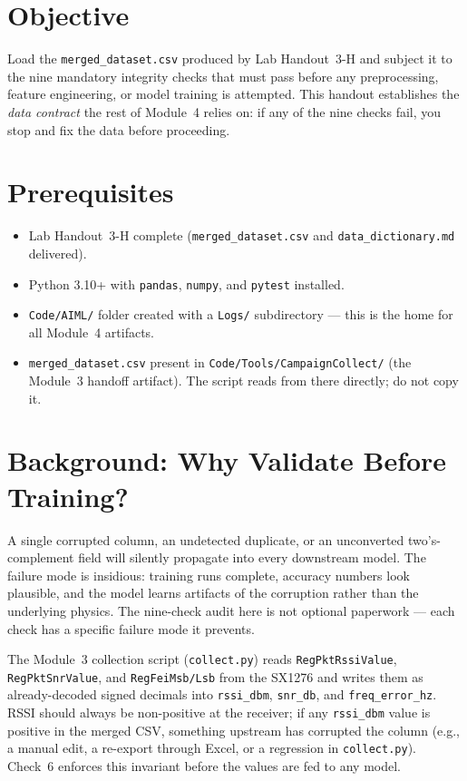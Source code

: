 \documentclass[11pt,letterpaper]{article}
\begin{document}

\section{Objective}
Load the \texttt{merged\_dataset.csv} produced by Lab Handout~3-H and subject it to the nine mandatory integrity checks that must pass before any preprocessing, feature engineering, or model training is attempted. This handout establishes the \emph{data contract} the rest of Module~4 relies on: if any of the nine checks fail, you stop and fix the data before proceeding.

\section{Prerequisites}
\begin{itemize}[leftmargin=2em]
	\item Lab Handout~3-H complete (\texttt{merged\_dataset.csv} and \texttt{data\_dictionary.md} delivered).
	\item Python 3.10+ with \texttt{pandas}, \texttt{numpy}, and \texttt{pytest} installed.
	\item \texttt{Code/AIML/} folder created with a \texttt{Logs/} subdirectory --- this is the home for all Module~4 artifacts.
	\item \texttt{merged\_dataset.csv} present in \texttt{Code/Tools/CampaignCollect/} (the Module~3 handoff artifact). The script reads from there directly; do not copy it.
\end{itemize}

\section{Background: Why Validate Before Training?}
A single corrupted column, an undetected duplicate, or an unconverted two's-complement field will silently propagate into every downstream model. The failure mode is insidious: training runs complete, accuracy numbers look plausible, and the model learns artifacts of the corruption rather than the underlying physics. The nine-check audit here is not optional paperwork --- each check has a specific failure mode it prevents.

\begin{tcolorbox}[infobox={Sign Sanity on RSSI}]
	The Module~3 collection script (\texttt{collect.py}) reads \texttt{RegPktRssiValue}, \texttt{RegPktSnrValue}, and \texttt{RegFeiMsb/Lsb} from the SX1276 and writes them as already-decoded signed decimals into \texttt{rssi\_dbm}, \texttt{snr\_db}, and \texttt{freq\_error\_hz}. \mbox{RSSI} should always be non-positive at the receiver; if any \texttt{rssi\_dbm} value is positive in the merged \mbox{CSV}, something upstream has corrupted the column (e.g., a manual edit, a re-export through Excel, or a regression in \texttt{collect.py}). Check~6 enforces this invariant before the values are fed to any model.
\end{tcolorbox}
\end{document}
